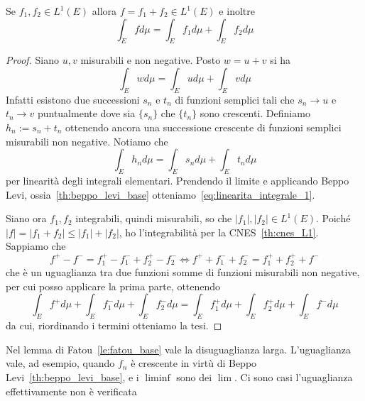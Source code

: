 \begin{proposition}
    Se \(f_{1}, f_{2} \in L^{1}(E)\) allora \(f = f_{1}+f_{2} \in L^{1}{(E)}\) e
    inoltre
    \[
        \int_E f d\mu = \int_E f_{1} d\mu + \int_E f_{2} d\mu
    \]
\end{proposition}
\begin{proof}
    Siano \(u,v\) misurabili e non negative. Posto \(w = u +v\) si ha 
    \begin{equation}\label{eq:linearita_integrale_1}
        \int_E w d\mu = \int_{E} u d\mu + \int_E v d\mu
    \end{equation}
    Infatti esistono due successioni \(s_{n}\) e \(t_{n}\) di funzioni semplici
    tali che \(s_{n} \to u\) e \(t_{n} \to v\) puntualmente dove sia \(\{s_{n}\} \)
    che \(\{t_{n}\} \) sono crescenti. Definiamo \(h_{n} := s_{n} + t_{n}\)
    ottenendo ancora una successione crescente di funzioni semplici misurabili
    non negative. Notiamo che  
    \[
        \int_E h_{n} d\mu = \int_E s_{n} d\mu + \int_E t_{n} d\mu
    \]
    per linearità degli integrali elementari. Prendendo il limite e applicando Beppo
    Levi, ossia~\ref{th:beppo_levi_base}
    otteniamo~\eqref{eq:linearita_integrale_1}. 

    Siano ora \(f_{1}, f_{2}\) integrabili, quindi misurabili, so che
    \(|f_{1}|, |f_{2}| \in L^{1}{(E)}\). Poiché \(|f| = |f_{1}+f_{2}| \le
    |f_{1}|+|f_{2}|\), ho l'integrabilità per la CNES~\ref{th:cnes_L1}.
    Sappiamo che 
    \[
        f^{+}- f^{-} = f_{1}^{+} -f_{1}^{-} + f_{2}^{+} - f_{2}^{-} \iff f^{+} +
        f^{-}_1 +f^{-}_2 = f_{1}^{+} + f_{2}^{+} + f^{-}
    \]
    che è un uguaglianza tra due funzioni somme di funzioni misurabili non
    negative, per cui posso applicare la prima parte, ottenendo
    \[
        \int_E f^{+} d\mu + \int_E f^{-}_1 d\mu + \int_E f^{-}_2 d\mu = \int_E
        f_{1}^{+} d\mu + \int_E f_{2}^{+} d\mu + \int_E f^{-} d\mu 
    \]
    da cui, riordinando i termini otteniamo la tesi.
\end{proof}

Nel lemma di Fatou~\ref{le:fatou_base} vale la disuguaglianza larga. L'uguaglianza vale, ad esempio, quando
\(f_{n}\) è crescente in virtù di Beppo Levi~\ref{th:beppo_levi_base}, e
i \(\liminf \)  sono dei \(\lim\). Ci sono casi l'uguaglianza effettivamente non
è verificata

